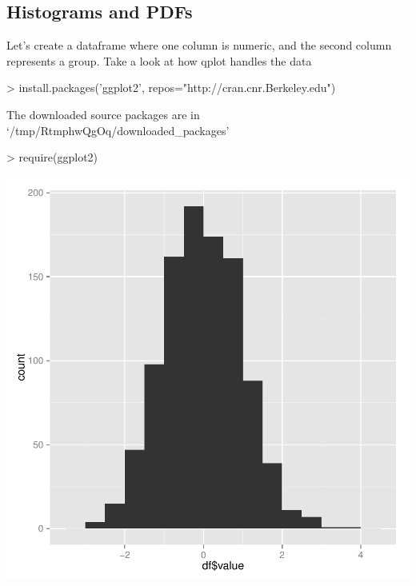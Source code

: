 \documentclass{article}
\begin{document}
\subsection{Histograms and PDFs}

Let's create a dataframe where one column is numeric, and the second column
represents a group.  Take a look at how qplot handles the data

\begin{Schunk}
\begin{Sinput}
> install.packages('ggplot2', repos="http://cran.cnr.Berkeley.edu")
\end{Sinput}
\begin{Soutput}
The downloaded source packages are in
	‘/tmp/RtmphwQgOq/downloaded_packages’
\end{Soutput}
\begin{Sinput}
> require(ggplot2)
\end{Sinput}
\end{Schunk}

\begin{Schunk}
\end{Schunk}
\includegraphics{cookbook-032}
\end{document}
